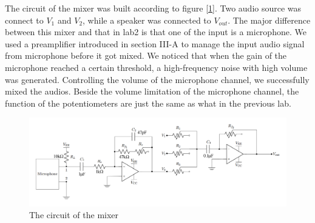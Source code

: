 The circuit of the mixer was built according to figure [\ref{fig:clip}]. Two audio source was connect to $V_1$ and $V_2$, while a speaker was connected to $V_{out}$. The major difference between this mixer and that in lab2 is that one of the input is a microphone. We used a preamplifier introduced in section III-A to manage the input audio signal from microphone before it got mixed. We noticed that when the gain of the microphone reached a certain threshold, a high-frequency noise with high volume was generated. Controlling the volume of the microphone channel, we successfully mixed the audios. Beside the volume limitation of the microphone channel, the function of the potentiometers are just the same as what in the previous lab. 


\begin{figure}[!htbp]
	\centering
	\begin{framed}
		\includegraphics[width=\textwidth]{images/clip.png}
		\caption{The circuit of the mixer}
		\label{fig:clip}
	\end{framed}
\end{figure}